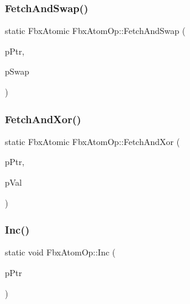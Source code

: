 \mbox{\label{class_fbx_atom_op_a794938359397610bea4bfb4e5f005ab3}} 
\subsubsection{\texorpdfstring{Fetch\+And\+Swap()}{FetchAndSwap()}}
{\footnotesize\ttfamily static Fbx\+Atomic Fbx\+Atom\+Op\+::\+Fetch\+And\+Swap (\begin{DoxyParamCaption}\item[{volatile Fbx\+Atomic $\ast$}]{p\+Ptr,  }\item[{Fbx\+Atomic}]{p\+Swap }\end{DoxyParamCaption})\hspace{0.3cm}{\ttfamily [static]}}

\mbox{\label{class_fbx_atom_op_a45474ae63424456067d8ac4cb731bc5b}} 
\subsubsection{\texorpdfstring{Fetch\+And\+Xor()}{FetchAndXor()}}
{\footnotesize\ttfamily static Fbx\+Atomic Fbx\+Atom\+Op\+::\+Fetch\+And\+Xor (\begin{DoxyParamCaption}\item[{volatile Fbx\+Atomic $\ast$}]{p\+Ptr,  }\item[{Fbx\+Atomic}]{p\+Val }\end{DoxyParamCaption})\hspace{0.3cm}{\ttfamily [static]}}

\mbox{\label{class_fbx_atom_op_a8eb5901c61891a6203d2ac10e139fd37}} 
\subsubsection{\texorpdfstring{Inc()}{Inc()}}
{\footnotesize\ttfamily static void Fbx\+Atom\+Op\+::\+Inc (\begin{DoxyParamCaption}\item[{volatile Fbx\+Atomic $\ast$}]{p\+Ptr }\end{DoxyParamCaption})\hspace{0.3cm}{\ttfamily [static]}}

